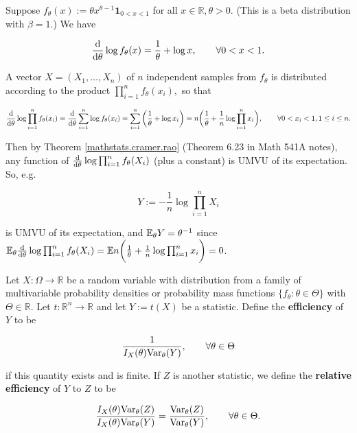 \begin{example} Suppose \(f_\theta(x) := \theta x^{\theta - 1} \boldsymbol{1}_{0 < x < 1} \) for all \(x \in \mathbb{R}, \theta > 0\). (This is a beta distribution with \(\beta = 1\).) We have

\[
\deriv{}{\theta} \log f_\theta(x) = \frac{1}{\theta} + \log x, \qquad \forall 0 < x < 1.
\]

A vector \(X = (X_1, \ldots, X_n)\) of \(n\) independent samples from \(f_\theta\) is distributed according to the product \(\prod_{i=1}^n f_\theta(x_i),\) so that 

\[
\deriv{}{\theta} \log \prod_{i=1}^n f_\theta(x_i) = \deriv{}{\theta}   \sum_{i=1}^n \log  f_\theta(x_i) = \sum_{i=1}^n \bigg( \frac{1}{\theta} + \log x_i \bigg) = n \bigg( \frac{1}{\theta} + \frac{1}{n} \log \prod_{i=1}^n x_i \bigg), \qquad \forall 0 < x_i < 1, 1 \leq i \leq n.
\]

Then by Theorem \ref{mathstats.cramer.rao} (Theorem 6.23 in Math 541A notes), any function of \(\deriv{}{\theta} \log \prod_{i=1}^n f_\theta(X_i) \) (plus a constant) is UMVU of its expectation. So, e.g.

\[
Y:= - \frac{1}{n} \log \prod_{i=1}^n X_i
\]

is UMVU of its expectation, and \(\E_\theta Y = \theta^{-1}\) since \(\E_\theta \deriv{}{\theta} \log \prod_{i=1}^n f_\theta(X_i) = \E  n \bigg( \frac{1}{\theta} + \frac{1}{n} \log \prod_{i=1}^n x_i \bigg) = 0\).

\end{example}

\begin{definition} Let \(X: \Omega \to \mathbb{R}\) be a random variable with distribution from a family of multivariable probability densities or probability mass functions \(\{f_\theta: \theta \in \Theta\}\) with \(\Theta \in \mathbb{R}\). Let \(t: \mathbb{R}^n \to \mathbb{R}\) and let \(Y:= t(X)\) be a statistic. Define the \textbf{efficiency} of \(Y\) to be

\[
\frac{1}{I_X(\theta) \Var_\theta (Y)}, \qquad \forall \theta \in \Theta
\]

if this quantity exists and is finite. If \(Z\) is another statistic, we define the \textbf{relative efficiency} of \(Y\) to \(Z\) to be

\[
\frac{I_X(\theta) \Var_\theta(Z)}{I_X(\theta) \Var_\theta(Y)} = \frac{\Var_\theta(Z)}{\Var_\theta(Y)}, \qquad \forall \theta \in \Theta.
\]

\end{definition}

